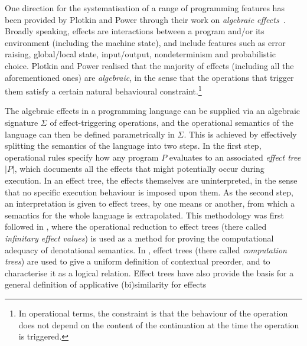 One direction for the systematisation of a range of programming features has been provided by Plotkin and Power through their work on
 \emph{algebraic effects}~\cite{plotkin2001adequacy,PlotkinPower2002}. Broadly speaking, effects are interactions between a  program and/or its environment (including the machine state), and include features such as
 error raising, global/local state, input/output, nondeterminism and probabilistic choice. 
 Plotkin and Power realised that the majority of effects (including all the aforementioned ones) are \emph{algebraic}, in the sense that the operations that trigger them %
 satisfy a certain natural behavioural constraint.\footnote{In operational terms, the constraint  is that the behaviour of the operation does not depend on the content of the continuation at the time the operation is triggered.} 

The algebraic effects  in a programming language can  be supplied via an algebraic signature $\Sigma$ of effect-triggering operations,
and the operational semantics of the language can then be defined parametrically in $\Sigma$. 
This is achieved by effectively splitting the semantics of 
the language into two steps. In the first step, operational rules specify how any program $P$ evaluates 
to an associated \emph{effect tree} $|P|$, 
which documents  all the effects that might potentially occur during execution. %
In an effect tree, the effects themselves are uninterpreted, in the sense that no specific execution behaviour is imposed upon them. 
As the second step, an interpretation is given to effect trees, by one means or another, from which a semantics for the whole language is extrapolated.
This methodology was first followed in \cite{plotkin2001adequacy}, where the operational reduction to effect trees (there called \emph{infinitary effect values}) is used as a method for proving the computational adequacy of denotational semantics. 
In \cite{gom}, effect trees (there called \emph{computation trees}) are used to give a uniform definition of 
contextual preorder, %
and to characterise it as a logical relation.
Effect trees have also provide the basis for a general definition of applicative (bi)similarity for effects~\cite{Ugo2017,SV2018,Voor2018}



